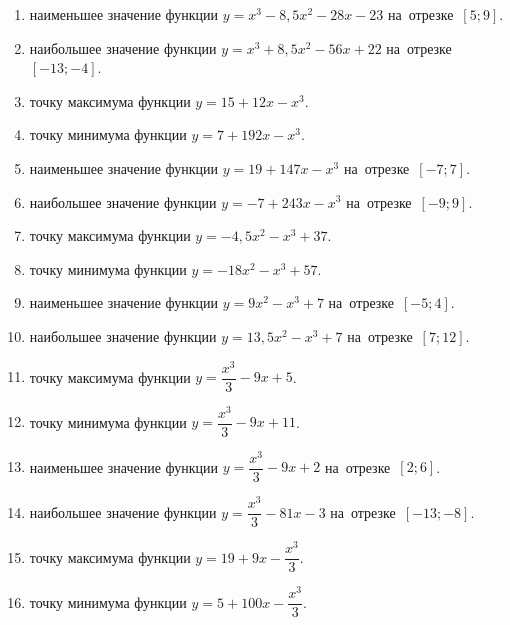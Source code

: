 \documentclass[a4paper,10pt]{article}
\begin{document}
\begin{enumerate}
\item {} наименьшее значение функции $y=x^3 -8,5x^2-28x-23$ на~отрезке~$\left[5;9\right]$.

\item {} наибольшее значение функции $y=x^3 +8,5x^2-56x+22$ на~отрезке~$\left[-13;-4\right]$.

\item {} точку максимума функции $y=15+12x-x^3$.

\item {} точку минимума функции $y=7+192x-x^3$.

\item {} наименьшее значение функции $y=19+147x-x^3$ на~отрезке~$\left[-7;7\right]$.

\item {} наибольшее значение функции $y=-7+243x-x^3$ на~отрезке~$\left[-9;9\right]$.

\item {} точку максимума функции $y=-4,5x^2-x^3+37$.

\item {} точку минимума функции $y=-18x^2-x^3+57$.

\item {} наименьшее значение функции $y=9x^2-x^3+7$ на~отрезке~$\left[-5;4\right]$.

\item {} наибольшее значение функции $y=13,5x^2-x^3+7$ на~отрезке~$\left[7;12\right]$.

\item {} точку максимума функции $y=\dfrac{x^3}{3} -9x+5$.

\item {} точку минимума функции $y=\dfrac{x^3}{3} -9x+11$.

\item {} наименьшее значение функции $y=\dfrac{x^3}{3} -9x+2$ на~отрезке~$\left[2;6\right]$.

\item {} наибольшее значение функции $y=\dfrac{x^3}{3} -81x-3$ на~отрезке~$\left[-13;-8\right]$.

\item {} точку максимума функции $y=19 +9x-\dfrac{x^3}{3}$.

\item {} точку минимума функции $y=5 +100x-\dfrac{x^3}{3}$.


\end{enumerate}
\end{document}
